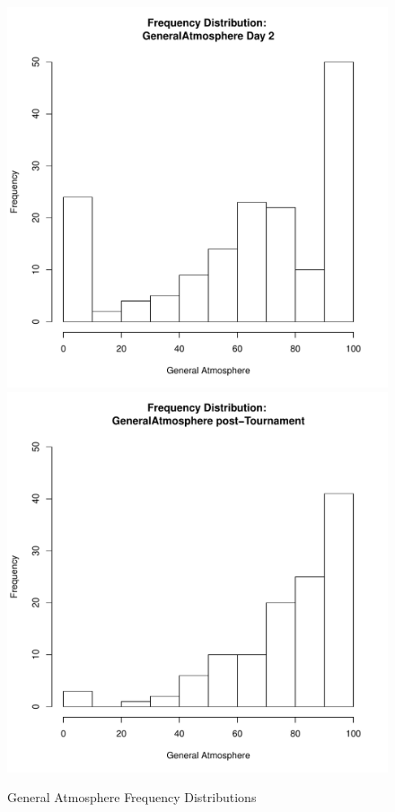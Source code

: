 \documentclass[12pt]{report}
\begin{document}
{\begin{figure}[htbp]
  \includegraphics[scale =.4]{../images/distGeneralAtmosphereDay2.pdf}
  \includegraphics[scale =.4]{../images/distGeneralAtmospherePost.pdf}
  \caption{General Atmosphere Frequency Distributions}
  \label{fig:generalAtmosphereDist}
\end{figure}



}
\end{document}
